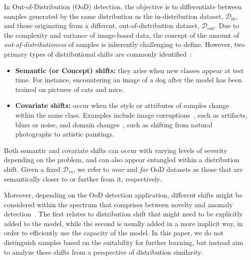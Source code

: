 \documentclass[10pt,twocolumn,a4paper]{article}
\begin{document}
In Out-of-Distribution (OoD) detection, the objective is to differentiate between samples generated by the same distribution as the in-distribution dataset, \(\mathcal{D}_{\text{in}}\), and those originating from a different, out-of-distribution dataset, \(\mathcal{D}_{\text{out}}\). Due to the complexity and variance of image-based data, the concept of the amount of \emph{out-of-distributioness} of samples is inherently challenging to define. However, two primary types of distributional shifts are commonly identified~\cite{tian2021exploring}:
\begin{itemize} 
    \item \textbf{Semantic (or Concept) shifts:} they arise when new classes appear at test time. For instance, encountering an image of a dog after the model has been trained on pictures of cats and mice.
    \item \textbf{Covariate shifts:} occur when the style or attributes of samples change within the same class. Examples include image corruptions~\cite{hendrycks2018benchmarking}, such as artifacts, blurs or noise, and domain changes~\cite{hendrycks2021faces, wang2024dissecting}, such as shifting from natural photographs to artistic paintings.
\end{itemize}

\noindent Both semantic and covariate shifts can occur with varying levels of severity depending on the problem, and can also appear entangled within a distribution shift. Given a fixed $\mathcal{D}_{in}$, we refer to \textit{near} and \textit{far} OoD datasets as those that are semantically closer to or further from it, respectively.

Moreover, depending on the OoD detection application, different shifts might be considered within the spectrum that comprises between novelty and anomaly detection~\cite{masana2018metric}. The first relates to distribution shift that might need to be explicitly added to the model, while the second is usually added in a more implicit way, in order to efficiently use the capacity of the model. In this paper, we do not distinguish samples based on the suitability for further learning, but instead aim to analyze these shifts from a perspective of distribution similarity.
\end{document}
